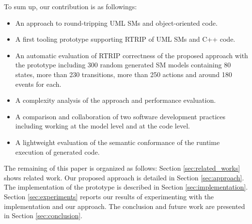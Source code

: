 To sum up, our contribution is as followings:
\begin{itemize}
  \item An approach to round-tripping UML SMs and object-oriented code.
  \item A first tooling prototype supporting RTRIP of UML SMs and C++ code.
  \item An automatic evaluation of RTRIP correctness of the proposed approach with the prototype including 300 random generated SM models containing 80 states, more than 230 transitions, more than 250 actions and around 180 events for each.
  \item A complexity analysis of the approach and performance evaluation.
  \item A comparison and collaboration of two software development practices including working at the model level and at the code level.
  \item A lightweight evaluation of the semantic conformance of the runtime execution of generated code.
\end{itemize}

The remaining of this paper is organized as follows: Section \ref{sec:related_works} shows related work. Our proposed approach is detailed in Section \ref{sec:approach}. The implementation of the prototype is described in Section \ref{sec:implementation}. Section \ref{sec:experiments} reports our results of experimenting with the implementation and our approach. The conclusion and future work are presented in Section \ref{sec:conclusion}.

